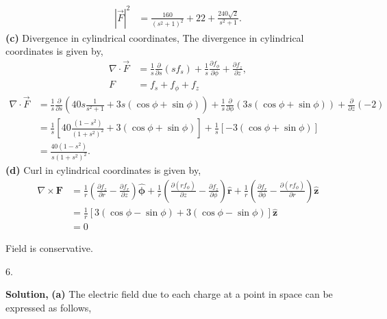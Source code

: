 \documentclass{article}
\begin{document}
\begin{align*}
|\vec{F}|^2 &= 
    \frac{160}{(s^2+1)^2} 
    + 22 
    + \frac{240\sqrt{2}}{s^2+1}.
\end{align*}
\textbf{(c)} Divergence in cylindrical coordinates,
The divergence in cylindrical coordinates is given by,
\begin{align*}
\nabla \cdot \vec{F} &= 
    \frac{1}{s} 
    \frac{\partial}{\partial s}(s f_s) 
    + 
    \frac{1}{s} 
    \frac{\partial f_\phi}{\partial \phi} 
    + 
    \frac{\partial f_z}{\partial z},
\\
F &= 
        f_s
        + f_{\phi} + f_z
\end{align*}
\begin{align*}
\nabla \cdot\vec{F}&= 
\frac{1}{s} \frac{\partial}{\partial s} 
\left( 
40s \frac{1}{s^2+1} + 3s (\cos\phi + \sin\phi) 
\right) 
+ \frac{1}{s} \frac{\partial}{\partial \phi} 
\left( 
3s (\cos\phi + \sin\phi) 
\right) 
+ \frac{\partial}{\partial z} (-2) \\
&= \frac{1}{s} 
\left[ 
40 \frac{\left( 1 - s^2 \right)}{ 
\left( 1 + s^2 \right)^2 }
+ 3 (\cos\phi + \sin\phi)
\right] 
+ \frac{1}{s} 
\left[ -3    (\cos\phi + \sin\phi) 
\right] \\
&= \frac{40 (1 - s^2)}{s (1 + s^2)^2}.
\end{align*}
\textbf{(d)} Curl in cylindrical coordinates is given by,
\begin{align*}
\nabla \times \mathbf{F} &= \frac{1}{r} \left( \frac{\partial f_z}{\partial r} - \frac{\partial f_r}{\partial z} \right) \hat{\boldsymbol{\phi}} 
+ \frac{1}{r} \left( \frac{\partial (r f_\phi)}{\partial z} - \frac{\partial f_z}{\partial \phi} \right) \hat{\mathbf{r}} 
+ \frac{1}{r} \left( \frac{\partial f_r}{\partial \phi} - \frac{\partial (r f_\phi)}{\partial r} \right) \hat{\mathbf{z}} \\
&= \frac{1}{r} [3 (\cos\phi - \sin\phi) + 3 (\cos\phi - \sin\phi)] \hat{\mathbf{z}} \\
&= 0
\end{align*}

Field is conservative.\newline \newline


6. \newline

\textbf{Solution,}\newline
\textbf{(a)} The electric field due to each charge at a point in space can be expressed as follows,
\end{document}
